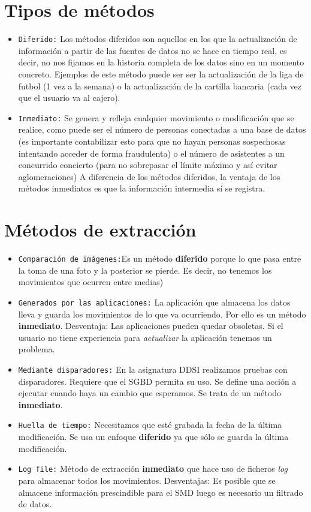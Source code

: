 \section{Tipos de métodos}
\begin{itemize}
	\item \texttt{Diferido:} Los métodos diferidos son aquellos en los que la actualización de información a partir de las fuentes de datos no se hace en tiempo real, es decir, no nos fijamos en la historia completa de los datos sino en un momento concreto.  Ejemplos de este método puede ser  ser la actualización de la liga de futbol (1 vez a la semana) o la actualización de la cartilla bancaria (cada vez que el usuario va al cajero).
	
	\item \texttt{Inmediato:} Se genera y refleja cualquier movimiento o modificación que se realice, como puede ser el número de personas conectadas a una base de datos (es importante contabilizar esto para que no hayan personas sospechosas intentando acceder de forma fraudulenta) o el número de asistentes a un concurrido concierto (para no sobrepasar el límite máximo y así evitar aglomeraciones)
	A diferencia de los métodos diferidos, la ventaja de los métodos inmediatos es que la información intermedia sí se registra.

\end{itemize}


\section{Métodos de extracción}
\begin{itemize}
	\item \texttt{Comparación de imágenes:}Es un método \textbf{diferido} porque lo que pasa entre la toma de una foto y la posterior se pierde. Es decir, no tenemos los movimientos que ocurren entre medias) 
	\item \texttt{Generados por las aplicaciones:} La aplicación que almacena los datos lleva y guarda los movimientos de lo que va ocurriendo. Por ello es un método \textbf{inmediato}. Desventaja: Las aplicaciones pueden quedar obsoletas. Si el usuario no tiene experiencia para \textit{actualizar} la aplicación tenemos un problema.
	\item \texttt{Mediante disparadores:} En la asignatura DDSI realizamos pruebas con disparadores. Requiere que el SGBD permita su uso. Se define una acción a ejecutar cuando haya un cambio que esperamos. Se trata de un método \textbf{inmediato}.
	\item \texttt{Huella de tiempo:} Necesitamos que esté grabada la fecha de la última modificación. Se usa un enfoque \textbf{diferido} ya que sólo se guarda la última modificación.
	\item \texttt{Log file:} Método de extracción \textbf{inmediato} que hace uso de ficheros \textit{log} para almacenar todos los movimientos. Desventajas: Es posible que se almacene información prescindible para el SMD luego es necesario un filtrado de datos.
\end{itemize}
	

